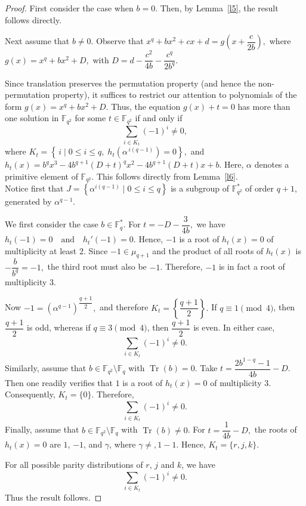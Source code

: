\documentclass[10pt,a4paper]{amsart}
\begin{document}
\begin{proof}
First consider the case when $b=0$. Then, by Lemma~\ref{l5}, the result follows directly.

Next assume that $b\neq 0$. Observe that
$
x^q+bx^2+cx+d = g\!\left(x+\dfrac{c}{2b}\right),
$
where
$
g(x)=x^q+bx^2+D,
$
with
$
D=d-\dfrac{c^2}{4b}-\dfrac{c^q}{2b^q}.
$


Since translation preserves the permutation property (and hence the non-permutation property), it suffices to restrict our attention to polynomials of the form $g(x)=x^q+bx^2+D$.
Thus, the equation
$
g(x)+t=0
$
has more than one solution in $\mathbb{F}_{q^2}$ for some $t\in \mathbb{F}_{q^2}$ if and only if
$$
\sum_{i\in K_t} (-1)^i \neq 0,
$$
 where
$
K_t=\left\{\, i \mid 0\leq i\leq q,\; h_t\!\left(\alpha^{\,i(q-1)}\right)=0 \right\},
$
and
$
h_t(x)=b^q x^3-4b^{q+1}(D+t)^q x^2-4b^{q+1}(D+t)x+b.
$
Here, $\alpha$ denotes a primitive element of $\mathbb{F}_{q^2}$. This follows directly from Lemma~\ref{l6}.\\
Notice first that
$
J=\left\{\alpha^{i(q-1)} \mid 0\leq i\leq q \right\}
$
is a subgroup of $\mathbb{F}_{q^2}^{*}$ of order $q+1$, generated by $\alpha^{q-1}$.

We first consider the case $b\in \mathbb{F}_q^{*}$. For
$
t=-D-\dfrac{3}{4b},
$
we have
$
h_t(-1)=0
\quad\text{and}\quad
h_t'(-1)=0.
$
Hence, $-1$ is a root of $h_t(x)=0$ of multiplicity at least $2$. Since $-1\in \mu_{q+1}$ and the product of all roots of $h_t(x)$ is
$
-\dfrac{b}{b^q}=-1,
$
the third root must also be $-1$. Therefore, $-1$ is in fact a root of multiplicity $3$.

Now
$
-1=(\alpha^{q-1})^{\dfrac{q+1}{2}},
$
and therefore
$
K_t=\left\{\dfrac{q+1}{2}\right\}.
$
If $q\equiv 1 \pmod 4$, then $\dfrac{q+1}{2}$ is odd, whereas if $q\equiv 3 \pmod 4$, then $\dfrac{q+1}{2}$ is even. In either case,
$$
\sum_{i\in K_t} (-1)^i \neq 0.
$$
Similarly, assume that $b\in \mathbb{F}_{q^2}\setminus \mathbb{F}_q$ with $\operatorname{Tr}(b)=0$. Take
$
t=\dfrac{2b^{1-q}-1}{4b}-D.
$
Then one readily verifies that $1$ is a root of $h_t(x)=0$ of multiplicity $3$. Consequently,
$
K_t=\{0\}.
$
Therefore,
$$
\sum_{i\in K_t} (-1)^i \neq 0.
$$
Finally, assume that $b\in \mathbb{F}_{q^2}\setminus \mathbb{F}_q$ with $\operatorname{Tr}(b)\neq 0$. For
$
t=\dfrac{1}{4b}-D,
$
the roots of $h_t(x)=0$ are $1$, $-1$, and $\gamma$, where $\gamma\neq ,1-1$. Hence,
$
K_t=\{r,j,k\}.
$

For all possible parity distributions of $r$, $j$ and $k$, we have
$$
\sum_{i\in K_t} (-1)^i \neq 0.
$$
Thus the result follows.

\end{proof}
\end{document}

